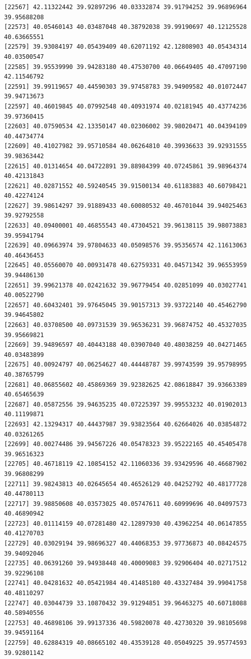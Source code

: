 \documentclass[
  letterpaper,
  DIV=11,
  numbers=noendperiod]{scrartcl}
\begin{document}
\begin{verbatim}
[22567] 42.11322442 39.92897296 40.03332874 39.91794252 39.96896964 39.95688208
[22573] 40.05460143 40.03487048 40.38792038 39.99190697 40.12125528 40.63665551
[22579] 39.93084197 40.05439409 40.62071192 42.12808903 40.05434314 40.03500547
[22585] 39.95539990 39.94283180 40.47530700 40.06649405 40.47097190 42.11546792
[22591] 39.99119657 40.44590303 39.97458783 39.94909582 40.01072447 39.94713673
[22597] 40.46019845 40.07992548 40.40931974 40.02181945 40.43774236 39.97360415
[22603] 40.07590534 42.13350147 40.02306002 39.98020471 40.04394109 40.44734774
[22609] 40.41027982 39.95710584 40.06264810 40.39936633 39.92931555 39.98363442
[22615] 40.01314654 40.04722891 39.88984399 40.07245861 39.98964374 40.42131843
[22621] 40.02871552 40.59240545 39.91500134 40.61183883 40.60798421 40.42274124
[22627] 39.98614297 39.91889433 40.60080532 40.46701044 39.94025463 39.92792558
[22633] 40.09400001 40.46855543 40.47304521 39.96138115 39.98073883 39.95941794
[22639] 40.09663974 39.97804633 40.05098576 39.95356574 42.11613063 40.46436453
[22645] 40.05560070 40.00931478 40.62759331 40.04571342 39.96553959 39.94486130
[22651] 39.99621378 40.02421632 39.96779454 40.02851099 40.03027741 40.00522790
[22657] 40.60432401 39.97645045 39.90157313 39.93722140 40.45462790 39.94645802
[22663] 40.03708500 40.09731539 39.96536231 39.96874752 40.45327035 39.95669821
[22669] 39.94896597 40.40443188 40.03907040 40.48038259 40.04271465 40.03483899
[22675] 40.00924797 40.06254627 40.44448787 39.99743599 39.95798995 40.38765799
[22681] 40.06855602 40.45869369 39.92382625 42.08618847 39.93663389 40.65465639
[22687] 40.05872556 39.94635235 40.07225397 39.99553232 40.01902013 40.11199871
[22693] 42.13294317 40.44437987 39.93823564 40.62664026 40.03854872 40.03261265
[22699] 40.00274486 39.94567226 40.05478323 39.95222165 40.45405478 39.96516323
[22705] 40.46718119 42.10854152 42.11060336 39.93429596 40.46687902 39.96808299
[22711] 39.98243813 40.02645654 40.46526129 40.04252792 40.48177728 40.44780113
[22717] 39.98850608 40.03573025 40.05747611 40.60999696 40.04097573 40.46890942
[22723] 40.01114159 40.07281480 42.12897930 40.43962254 40.06147855 40.41270703
[22729] 40.03029194 39.98696327 40.44068353 39.97736873 40.08424575 39.94092046
[22735] 40.06391260 39.94938448 40.40009083 39.92906404 40.02717512 39.92296108
[22741] 40.04281632 40.05421984 40.41485180 40.43327484 39.99041758 40.48110297
[22747] 40.03044739 33.10870432 39.91294851 39.96463275 40.60718088 40.58940556
[22753] 40.46898106 39.99137336 40.59820078 40.42730320 39.98105698 39.94591164
[22759] 40.62884319 40.08665102 40.43539128 40.05049225 39.95774593 39.92801142

\end{verbatim}
\end{document}
